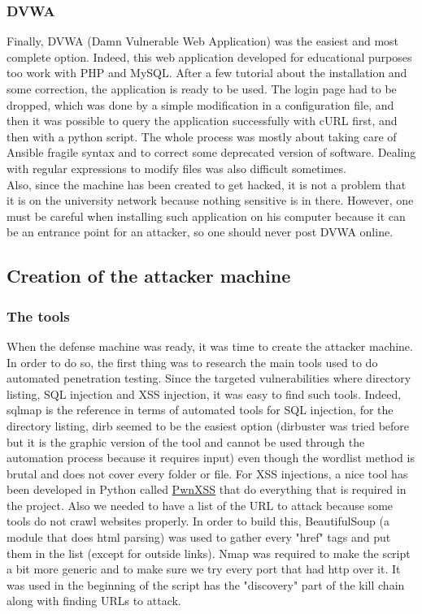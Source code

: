 \documentclass[a4paper,12pt,fleqn]{article}
\begin{document}
\subsubsection{DVWA}

Finally, DVWA (Damn Vulnerable Web Application) was the easiest and most complete option. Indeed, this web application developed for educational purposes too work with PHP and MySQL. After a few tutorial about the installation and some correction, the application is ready to be used. The login page had to be dropped, which was done by a simple modification in a configuration file, and then it was possible to query the application successfully with cURL first, and then with a python script. The whole process was mostly about taking care of Ansible fragile syntax and to correct some deprecated version of software. Dealing with regular expressions to modify files was also difficult sometimes.
\\
Also, since the machine has been created to get hacked, it is not a problem that it is on the university network because nothing sensitive is in there. However, one must be careful when installing such application on his computer because it can be an entrance point for an attacker, so one should never post DVWA online.

\subsection{Creation of the attacker machine}

\subsubsection{The tools}

When the defense machine was ready, it was time to create the attacker machine. In order to do so, the first thing was to research the main tools used to do automated penetration testing. Since the targeted vulnerabilities where directory listing, SQL injection and XSS injection, it was easy to find such tools. Indeed, sqlmap is the reference\cite{sqli} in terms of automated tools for SQL injection, for the directory listing, dirb\cite{dirb} seemed to be the easiest option (dirbuster was tried before but it is the graphic version of the tool and cannot be used through the automation process because it requires input) even though the wordlist method is brutal and does not cover every folder or file. For XSS injections, a nice tool has been developed in Python called \href{https://github.com/pwn0sec/PwnXSS}{PwnXSS} that do everything that is required in the project. Also we needed to have a list of the URL to attack because some tools do not crawl websites properly. In order to build this, BeautifulSoup (a module that does html parsing) was used to gather every "href" tags and put them in the list (except for outside links). Nmap was required to make the script a bit more generic and to make sure we try every port that had http over it. It was used in the beginning of the script has the "discovery" part of the kill chain along with finding URLs to attack.
\end{document}
